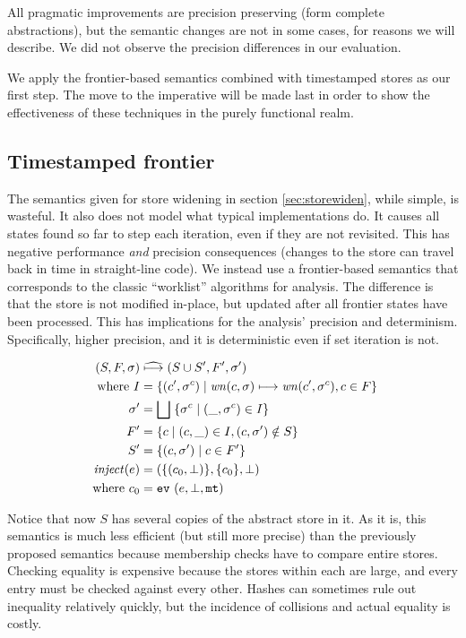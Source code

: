 \documentclass[preprint,onecolumn,9pt]{sigplanconf} %
\begin{document}
All pragmatic improvements are precision preserving (form complete
abstractions), but the semantic changes are not in some cases, for reasons we
will describe. We did not observe the precision differences in our evaluation.

We apply the frontier-based semantics combined with timestamped stores
as our first step.  The move to the imperative will be made last in
order to show the effectiveness of these techniques in the purely
functional realm.

\subsection{Timestamped frontier}

The semantics given for store widening in section \ref{sec:storewiden},
while simple, is wasteful. It also does not model what typical
implementations do. It causes all states found so far to step each
iteration, even if they are not revisited. This has negative
performance \emph{and} precision consequences (changes to the store
can travel back in time in straight-line code). We instead use a
frontier-based semantics that corresponds to the classic ``worklist''
algorithms for analysis. The difference is that the store is not
modified in-place, but updated after all frontier states have been
processed. This has implications for the analysis' precision and
determinism. Specifically, higher precision, and it is deterministic
even if set iteration is not.

\begin{align*}
(S, F, \sigma) &\mathrel{\widehat{\mathbin{\longmapsto}}} (S \cup S', F', \sigma') \\
\mbox{where } I &= \{(c',\sigma^c) \mid \mathit{wn}(c, \sigma) \mathrel{\mathbin{\longmapsto}} \mathit{wn}(c', \sigma^c), c \in F\} \\
              \sigma' &= \bigsqcup\; \{\sigma^c \mid (\_,\sigma^c) \in I\} \\
              F' &= \{c \mid (c,\_) \in I, (c,\sigma') \notin S\} \\
              S' &= \{(c,\sigma') \mid c \in F'\} \\
\mathit{inject}(e) &= (\{(c_0, \bot)\},\{c_0\},\bot) \\
\text{ where } c_0 &= {\tt ev{\ }}({e,\bot,{\tt mt}})
\end{align*}

Notice that now $S$ has several copies of the abstract store in it. As
it is, this semantics is much less efficient (but still more precise)
than the previously proposed semantics because membership checks have
to compare entire stores. Checking equality is expensive because the stores within each are
large, and every entry must be checked against every other. Hashes can
sometimes rule out inequality relatively quickly, but the incidence of
collisions and actual equality is costly.
\end{document}
